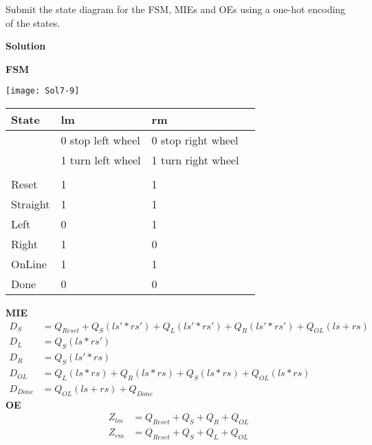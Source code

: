 \begin{enumerate}
        Submit the state diagram for the FSM,  MIEs and OEs using
        a one-hot encoding of the states.

        \begin{onlysolution}  \textbf{Solution} \itshape{

                \textbf{FSM}

                \texttt{[image: Sol7-9]}
                \begin{tabular}{l|l|l|l}
                    State    & lm                & rm                  \\ \hline
                    & 0 stop left wheel & 0 stop right wheel  \\ \hline
                    & 1 turn left wheel & 1 turn right wheel  \\ \hline
                    &                   &                     \\ \hline \hline
                    Reset    & 1                 & 1                   \\ \hline
                    Straight & 1                 & 1                   \\ \hline
                    Left     & 0                 & 1                   \\ \hline
                    Right    & 1                 & 0                   \\ \hline
                    OnLine   & 1                 & 1                   \\ \hline
                    Done     & 0                 & 0                   \\
                \end{tabular}
            }
            {\color{blue}
                \textbf{MIE}
                \begin{align*}
                    D_{S }    &= Q_{Reset} + Q_{S}(ls'*rs') + Q_{L}(ls'*rs') + Q_{R}(ls'*rs') + Q_{OL}(ls+rs)\\
                    D_{L }    &= Q_{S}(ls*rs') \\
                    D_{R }    &= Q_{S}(ls'*rs) \\
                    D_{OL}    &= Q_{L}(ls*rs)  + Q_{R}(ls*rs) + Q_{S}(ls*rs) + Q_{OL}(ls*rs)\\
                    D_{Done} &=  Q_{OL}(ls+rs) + Q_{Done}
                \end{align*}
                \textbf{OE}
                \begin{align*}
                    Z_{lm} &= Q_{Reset} + Q_{S} + Q_{R} + Q_{OL}\\
                    Z_{rm} &= Q_{Reset} + Q_{S} + Q_{L} + Q_{OL}
            \end{align*}}
        \end{onlysolution}


\end{enumerate}
